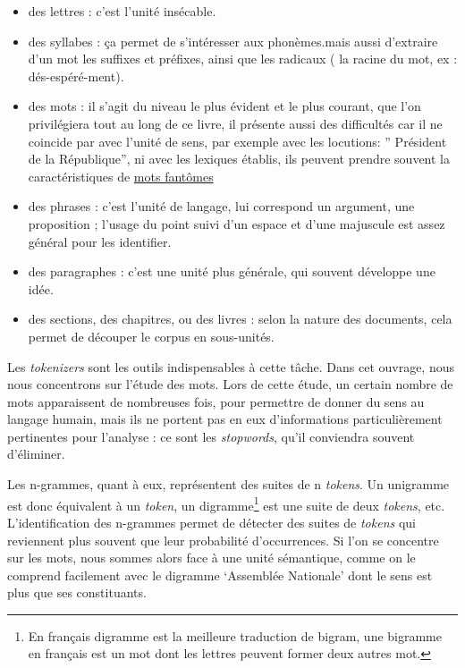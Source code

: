 \documentclass[
  letterpaper,
  DIV=11,
  numbers=noendperiod]{scrreprt}
\providecommand{\tightlist}{%
  \setlength{\itemsep}{0pt}\setlength{\parskip}{0pt}}\usepackage{longtable,booktabs,array}
\begin{document}
\begin{itemize}
\tightlist
\item
  des lettres : c'est l'unité insécable.
\item
  des syllabes : ça permet de s'intéresser aux phonèmes.mais aussi
  d'extraire d'un mot les suffixes et préfixes, ainsi que les radicaux (
  la racine du mot, ex : dés-espéré-ment).
\item
  des mots : il s'agit du niveau le plus évident et le plus courant, que
  l'on privilégiera tout au long de ce livre, il présente aussi des
  difficultés car il ne coincide par avec l'unité de sens, par exemple
  avec les locutions: '' Président de la République'', ni avec les
  lexiques établis, ils peuvent prendre souvent la caractéristiques de
  \href{http://stella.atilf.fr/MotsFantomes/}{mots fantômes}
\item
  des phrases : c'est l'unité de langage, lui correspond un argument,
  une proposition ; l'usage du point suivi d'un espace et d'une
  majuscule est assez général pour les identifier.
\item
  des paragraphes : c'est une unité plus générale, qui souvent développe
  une idée.
\item
  des sections, des chapitres, ou des livres : selon la nature des
  documents, cela permet de découper le corpus en sous-unités.
\end{itemize}

Les \emph{tokenizers} sont les outils indispensables à cette tâche. Dans
cet ouvrage, nous nous concentrons sur l'étude des mots. Lors de cette
étude, un certain nombre de mots apparaissent de nombreuses fois, pour
permettre de donner du sens au langage humain, mais ils ne portent pas
en eux d'informations particulièrement pertinentes pour l'analyse : ce
sont les \emph{stopwords}, qu'il conviendra souvent d'éliminer.

Les n-grammes, quant à eux, représentent des suites de n \emph{tokens}.
Un unigramme est donc équivalent à un \emph{token}, un
digramme\footnote{En français digramme est la meilleure traduction de
  bigram, une bigramme en français est un mot dont les lettres peuvent
  former deux autres mot.} est une suite de deux \emph{tokens}, etc.
L'identification des n-grammes permet de détecter des suites de
\emph{tokens} qui reviennent plus souvent que leur probabilité
d'occurrences. Si l'on se concentre sur les mots, nous sommes alors face
à une unité sémantique, comme on le comprend facilement avec le digramme
`Assemblée Nationale' dont le sens est plus que ses constituants.
\end{document}
